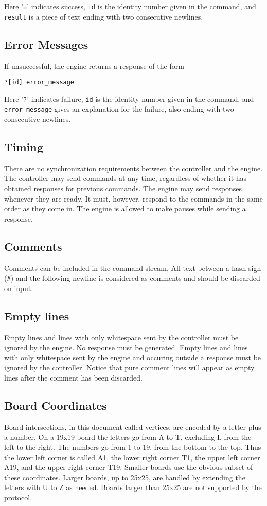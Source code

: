 \documentclass[a4paper]{article}
\begin{document}
Here '\texttt{=}' indicates success, \texttt{id} is the identity
number given in the command, and \texttt{result} is a piece of text
ending with two consecutive newlines.

\subsection{Error Messages}
If unsuccessful, the engine returns a response of the form

\begin{verbatim}
?[id] error_message
\end{verbatim}

Here '\texttt{?}' indicates failure, \texttt{id} is the identity
number given in the command, and \texttt{error\_message} gives an
explanation for the failure, also ending with two consecutive
newlines.

\subsection{Timing}
\label{sec:timing}
There are no synchronization requirements between the controller and the
engine. The controller may send commands at any time, regardless of
whether it has obtained responses for previous commands. The engine may
send responses whenever they are ready. It must, however, respond to the
commands in the same order as they come in. The engine is allowed to
make pauses while sending a response.

\subsection{Comments}
\label{sec:comments}
Comments can be included in the command stream. All text between a
hash sign (\texttt{\#}) and the following newline is considered as
comments and should be discarded on input.

\subsection{Empty lines}
Empty lines and lines with only whitespace sent by the controller must
be ignored by the engine. No response must be generated. Empty lines and
lines with only whitespace sent by the engine and occuring outside a
response must be ignored by the controller. Notice that pure comment
lines will appear as empty lines after the comment has been discarded.

\subsection{Board Coordinates}
\label{sec:board-coordinates}
Board intersections, in this document called vertices, are encoded by a
letter plus a number. On a 19x19 board the letters go from A to T,
excluding I, from the left to the right. The numbers go from 1 to 19,
from the bottom to the top. Thus the lower left corner is called A1, the
lower right corner T1, the upper left corner A19, and the upper right
corner T19. Smaller boards use the obvious subset of these coordinates.
Larger boards, up to 25x25, are handled by extending the letters with U
to Z as needed. Boards larger than 25x25 are not supported by the
protocol.
\end{document}

